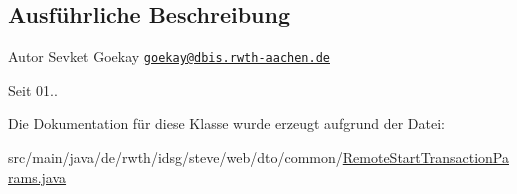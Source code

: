 \subsection{Ausführliche Beschreibung}
\begin{DoxyAuthor}{Autor}
Sevket Goekay \href{mailto:goekay@dbis.rwth-aachen.de}{\tt goekay@dbis.\+rwth-\/aachen.\+de} 
\end{DoxyAuthor}
\begin{DoxySince}{Seit}
01.. 
\end{DoxySince}


Die Dokumentation für diese Klasse wurde erzeugt aufgrund der Datei\+:\begin{DoxyCompactItemize}
\item 
src/main/java/de/rwth/idsg/steve/web/dto/common/\hyperlink{_remote_start_transaction_params_8java}{Remote\+Start\+Transaction\+Params.\+java}\end{DoxyCompactItemize}
